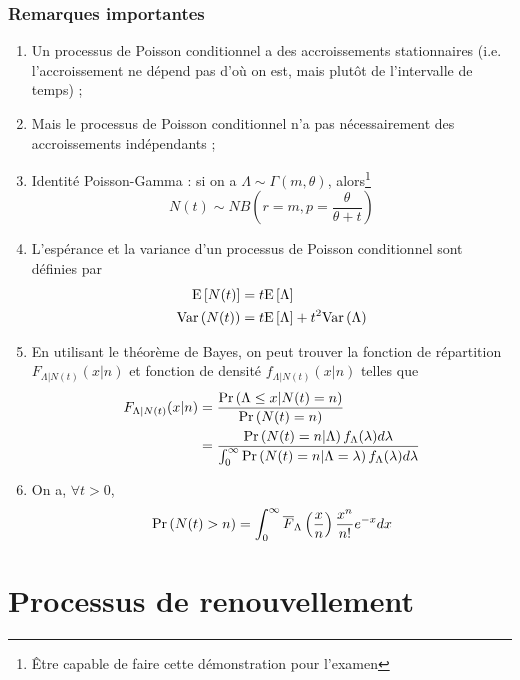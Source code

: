 \documentclass[10pt, french]{article}
\begin{document}
\begin{multicols*}{2}
\subsubsection*{Remarques importantes}
\begin{enumerate}[label=(\arabic*)]
\item Un processus de Poisson conditionnel a des accroissements stationnaires (i.e. l'accroissement ne dépend pas d'où on est, mais plutôt de l'intervalle de temps) ; 
\item Mais le processus de Poisson conditionnel n'a pas nécessairement des accroissements indépendants ;
\item Identité Poisson-Gamma : si on a $\Lambda \sim \Gamma(m, \theta)$, alors\footnote{Être capable de faire cette démonstration pour l'examen}
\[N(t) \sim NB\left(r = m, p = \frac{\theta}{\theta + t} \right) \]

\item L'espérance et la variance d'un processus de Poisson conditionnel sont définies par
\begin{align*}
\mathrm{E} \left[ N(t) \right] & = t \mathrm{E} \left[ \Lambda \right] \\
\mathrm{Var} \left( N(t) \right) & =  t \mathrm{E} \left[ \Lambda \right] + t^2 \mathrm{Var} \left( \Lambda \right)
\end{align*}

\item En utilisant le théorème de Bayes, on peut trouver la fonction de répartition $F_{\Lambda | N(t)}(x | n)$ et fonction de densité $f_{\Lambda | N(t)}(x | n)$ telles que
\begin{align*}
F_{\Lambda | N(t)}(x | n)	& = \frac{\Pr \left( \Lambda \leq x | N(t) = n \right)}{\Pr \left( N(t) = n \right)} \\
& = \frac{\Pr \left( N(t) = n | \Lambda \right) f_\Lambda(\lambda) d \lambda}{\int_{0}^{\infty} \Pr \left( N(t) = n | \Lambda = \lambda \right) f_\Lambda(\lambda) d\lambda} \\
\end{align*}

\item On a, $\forall t > 0$,
\begin{align*}
\Pr \left( N(t) > n \right) = \int_{0}^{\infty} \overline{F}_{\Lambda}\left( \frac{x}{n} \right) \frac{x^n}{n!} e^{-x} dx
\end{align*}
\end{enumerate}

\section{Processus de renouvellement}

\end{multicols*}
\end{document}
